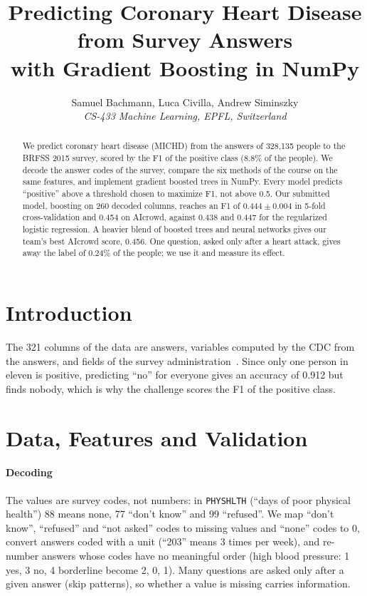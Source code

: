\documentclass[10pt,conference,compsocconf]{IEEEtran}
\begin{document}
\title{Predicting Coronary Heart Disease from Survey Answers\\
with Gradient Boosting in NumPy}

\author{
  Samuel Bachmann, Luca Civilla, Andrew Siminszky\\
  \textit{CS-433 Machine Learning, EPFL, Switzerland}
}

\maketitle

\begin{abstract}
  We predict coronary heart disease (MICHD) from the answers of 328,135 people to
  the BRFSS 2015 survey, scored by the F1 of the positive class (8.8\% of the
  people). We decode the answer codes of the survey, compare the six methods of
  the course on the same features, and implement gradient boosted trees in NumPy.
  Every model predicts ``positive'' above a threshold chosen to maximize F1, not
  above 0.5. Our submitted model, boosting on 260 decoded columns, reaches an F1 of
  $0.444 \pm 0.004$ in 5-fold cross-validation and 0.454 on AIcrowd, against
  0.438 and 0.447 for the regularized logistic regression. A heavier blend of
  boosted trees and neural networks gives our team's best AIcrowd score, 0.456.
  One question, asked only after a heart attack, gives away the label of 0.24\%
  of the people; we use it and measure its effect.
\end{abstract}

\section{Introduction}
The 321 columns of the data are answers, variables computed by the CDC from the
answers, and fields of the survey administration~\cite{brfss15}. Since only one
person in eleven is positive, predicting ``no'' for everyone gives an accuracy of
0.912 but finds nobody, which is why the challenge scores the F1 of the
positive class.

\section{Data, Features and Validation}\label{sec:data}

\paragraph{Decoding}
The values are survey codes, not numbers: in \texttt{PHYSHLTH} (``days of poor
physical health'') 88 means none, 77 ``don't know'' and 99 ``refused''. We map
``don't know'', ``refused'' and ``not asked'' codes to missing values and ``none''
codes to 0, convert answers coded with a unit (``203'' means 3 times per week),
and re-number answers whose codes have no meaningful order (high blood pressure:
1 yes, 3 no, 4 borderline become 2, 0, 1). Many questions are asked only after a
given answer (skip patterns), so whether a value is missing carries information.
\end{document}
